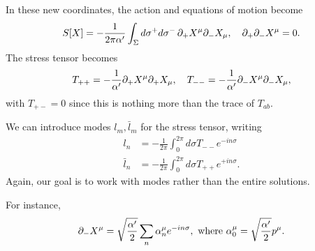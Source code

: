 In these new coordinates, the action and equations of motion become
\begin{equation}
    S[X]=-\frac{1}{2\pi \alpha'} \int_\Sigma d\sigma^+ d\sigma^- \, \partial_+ X^\mu \partial_- X_\mu, \quad \partial_+ \partial_- X^\mu =0.
\end{equation}
The stress tensor becomes
\begin{equation}
    T_{++}=-\frac{1}{\alpha'} \partial_+ X^\mu \partial_+ X_\mu, \quad T_{--}=-\frac{1}{\alpha'} \partial_- X^\mu \partial_- X_\mu,
\end{equation}
with $T_{+-}=0$ since this is nothing more than the trace of $T_{ab}$.

We can introduce modes $l_m, \bar l_m$ for the stress tensor, writing
\begin{align*}
    l_n &= -\frac{1}{2\pi}\int_0^{2\pi} d\sigma T_{--} e^{-in\sigma}\\
    \bar l_n &= -\frac{1}{2\pi}\int_0^{2\pi} d\sigma T_{++} e^{+in\sigma}.
\end{align*}
Again, our goal is to work with modes rather than the entire solutions.

For instance,
\begin{equation*}
    \partial_- X^\mu =\sqrt{\frac{\alpha'}{2}}\sum_n \alpha_n^\mu e^{-in\sigma},\text{ where } \alpha_0^\mu = \sqrt{\frac{\alpha'}{2}} p^\mu.
\end{equation*}